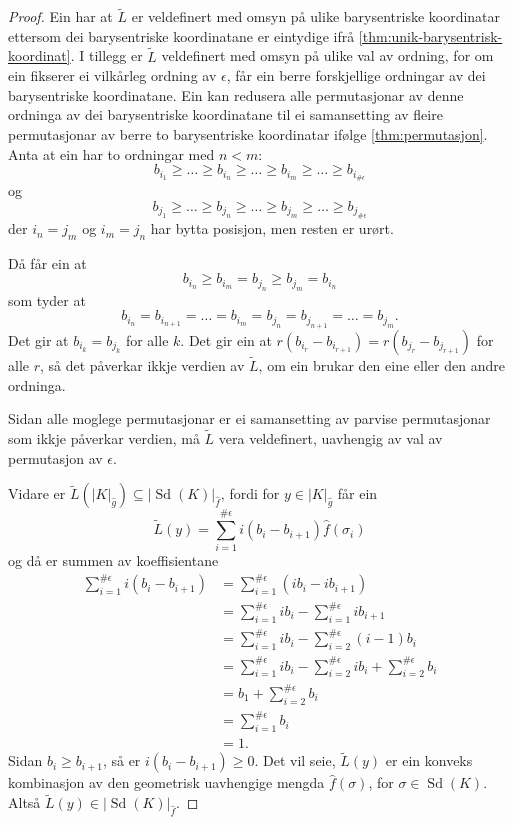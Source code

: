 \documentclass[a4paper, 12pt, norsk]{article}
\theoremstyle{plain}
\theoremstyle{definition}
\newcommand{\gr}[1]{ \lvert #1 \rvert } %
\newcommand{\tuple}[1]{ \left( #1 \right) } %
\DeclareMathOperator{\Sd}{Sd} %
\begin{document}
\begin{proof}
	Ein har at \( \tilde{L} \) er veldefinert med omsyn på ulike barysentriske koordinatar ettersom dei barysentriske koordinatane er eintydige ifrå \autoref{thm:unik-barysentrisk-koordinat}. I tillegg er \( \tilde{L} \) veldefinert med omsyn på ulike val av ordning, for om ein fikserer ei vilkårleg ordning av \( \epsilon \), får ein berre forskjellige ordningar av dei barysentriske koordinatane. Ein kan redusera alle permutasjonar av denne ordninga av dei barysentriske koordinatane til ei samansetting av fleire permutasjonar av berre to barysentriske koordinatar ifølge \autoref{thm:permutasjon}. Anta at ein har to ordningar med \( n < m \):
	\[
		b_{i_1} \geq \dots \geq b_{i_n} \geq \dots \geq b_{i_m} \geq \dots \geq b_{i_{\#\epsilon}}
	\]
	og
	\[
		b_{j_1} \geq \dots \geq b_{j_n} \geq \dots \geq b_{j_m} \geq \dots \geq b_{j_{\#\epsilon}}
	\]
	der \( i_n=j_m \) og \( i_m=j_n \) har bytta posisjon, men resten er urørt. 
	
	Då får ein at 
	\[ 
		b_{i_n} \geq b_{i_m}=b_{j_n} \geq b_{j_m}=b_{i_n}
	\] 
	som tyder at 
	\[ 
		b_{i_n} = b_{i_{n+1}} = \dots = b_{i_m}=b_{j_n}=b_{j_{n+1}}=\dots=b_{j_m}.
	\]
	Det gir at \( b_{i_k} = b_{j_k} \) for alle \( k \). Det gir ein at \( r\tuple{b_{i_r}-b_{i_{r+1}}} = r\tuple{b_{j_r}-b_{j_{r+1}}} \) for alle \( r \), så det påverkar ikkje verdien av \( \tilde{L} \), om ein brukar den eine eller den andre ordninga.

	Sidan alle moglege permutasjonar er ei samansetting av parvise permutasjonar som ikkje påverkar verdien, må \( \tilde{L} \) vera veldefinert, uavhengig av val av permutasjon av \( \epsilon \).

	Vidare er \( \tilde{L}(\gr{K}_{\hat{g}}) \subseteq \gr{\Sd(K)}_{\hat{f}} \), fordi for \( y \in \gr{K}_{\hat{g}} \) får ein
	\[
		\tilde{L}(y) = \sum_{i=1}^{\#\epsilon}i\tuple{b_i-b_{i+1}}\hat{f}(\sigma_i)
	\]
	og då er summen av koeffisientane
	\begin{align*}
		\sum_{i=1}^{\#\epsilon}i\tuple{b_i-b_{i+1}} &= \sum_{i=1}^{\#\epsilon}\tuple{ib_i-ib_{i+1}} \\
		&= \sum_{i=1}^{\#\epsilon}i b_i - \sum_{i=1}^{\#\epsilon}i b_{i+1} \\
		&= \sum_{i=1}^{\#\epsilon}i b_i - \sum_{i=2}^{\#\epsilon}\tuple{i-1}b_{i} \\
		&= \sum_{i=1}^{\#\epsilon}i b_i - \sum_{i=2}^{\#\epsilon}i b_{i} + \sum_{i=2}^{\#\epsilon}b_i \\
		&= b_1 + \sum_{i=2}^{\#\epsilon} b_i \\
		&= \sum_{i=1}^{\#\epsilon} b_i \\
		&= 1.
	\end{align*}
	Sidan \( b_i \geq b_{i+1} \), så er \( i\tuple{b_i-b_{i+1}} \geq 0 \). Det vil seie, \( \tilde{L}(y) \) er ein konveks kombinasjon av den geometrisk uavhengige mengda \( \hat{f}(\sigma) \), for \( \sigma \in \Sd(K) \). Altså \( \tilde{L}(y) \in \gr{\Sd(K)}_{\hat{f}} \).


\end{proof}
\end{document}
